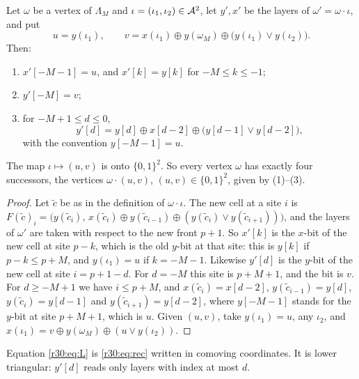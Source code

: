 \begin{lemma}\label{r30:lem:layer}
Let $\omega$ be a vertex of $\Lambda_M$ and $\iota=(\iota_1,\iota_2)\in\mathcal{A}^2$, let $y',x'$ be the layers of $\omega'=\omega\cdot\iota$, and put
\[
u=y(\iota_1),\qquad v=x(\iota_1)\oplus y(\omega_M)\oplus\bigl(y(\iota_1)\vee y(\iota_2)\bigr).
\]
Then:
\begin{enumerate}
\item $x'[-M-1]=u$, and $x'[k]=y[k]$ for $-M\le k\le-1$;
\item $y'[-M]=v$;
\item for $-M+1\le d\le0$,
\begin{equation}\label{r30:eq:L}
y'[d]=y[d]\oplus x[d-2]\oplus\bigl(y[d-1]\vee y[d-2]\bigr),
\end{equation}
with the convention $y[-M-1]=u$.
\end{enumerate}
The map $\iota\mapsto(u,v)$ is onto $\{0,1\}^2$. So every vertex $\omega$ has exactly four successors, the vertices $\omega\cdot(u,v)$, $(u,v)\in\{0,1\}^2$, given by \textup{(1)--(3)}.
\end{lemma}

\begin{proof}
Let $\tilde c$ be as in the definition of $\omega\cdot\iota$. The new cell at a site $i$ is $F(\tilde c)_i=\bigl(y(\tilde c_i),\,x(\tilde c_i)\oplus y(\tilde c_{i-1})\oplus(y(\tilde c_i)\vee y(\tilde c_{i+1}))\bigr)$, and the layers of $\omega'$ are taken with respect to the new front $p+1$. So $x'[k]$ is the $x$-bit of the new cell at site $p-k$, which is the old $y$-bit at that site: this is $y[k]$ if $p-k\le p+M$, and $y(\iota_1)=u$ if $k=-M-1$. Likewise $y'[d]$ is the $y$-bit of the new cell at site $i=p+1-d$. For $d=-M$ this site is $p+M+1$, and the bit is $v$. For $d\ge-M+1$ we have $i\le p+M$, and $x(\tilde c_i)=x[d-2]$, $y(\tilde c_{i-1})=y[d]$, $y(\tilde c_i)=y[d-1]$ and $y(\tilde c_{i+1})=y[d-2]$, where $y[-M-1]$ stands for the $y$-bit at site $p+M+1$, which is $u$. Given $(u,v)$, take $y(\iota_1)=u$, any $\iota_2$, and $x(\iota_1)=v\oplus y(\omega_M)\oplus(u\vee y(\iota_2))$.
\end{proof}

Equation \eqref{r30:eq:L} is \eqref{r30:eq:rec} written in comoving coordinates. It is lower triangular: $y'[d]$ reads only layers with index at most $d$.

